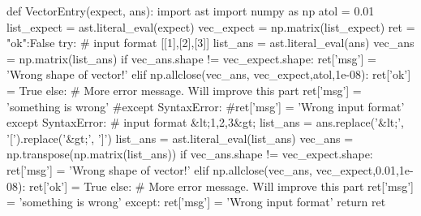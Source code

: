 
\begin{edXscript}
def VectorEntry(expect, ans):
	import ast
	import numpy as np 
  	atol = 0.01
	list_expect = ast.literal_eval(expect)
	vec_expect = np.matrix(list_expect)
  	ret = {"ok":False}
	try:
  		# input format [[1],[2],[3]]
		list_ans = ast.literal_eval(ans)
		vec_ans = np.matrix(list_ans)
  		if vec_ans.shape != vec_expect.shape:
  			ret['msg'] = 'Wrong shape of vector!'
  		elif np.allclose(vec_ans, vec_expect,atol,1e-08):
  			ret['ok'] = True
  		else:
  		# More error message. Will improve this part
  			ret['msg'] = 'something is wrong'   			
	#except SyntaxError:
		#ret['msg'] = 'Wrong input format'
	except SyntaxError:
  		# input format &lt;1,2,3&gt;
		list_ans = ans.replace('&lt;', '[').replace('&gt;', ']')
		list_ans = ast.literal_eval(list_ans)
		vec_ans = np.transpose(np.matrix(list_ans))
  		if vec_ans.shape != vec_expect.shape:
  			ret['msg'] = 'Wrong shape of vector!'
  		elif np.allclose(vec_ans, vec_expect,0.01,1e-08):
  			ret['ok'] = True
  		else:
    		# More error message. Will improve this part
  			ret['msg'] = 'something is wrong' 
  	except:
  		ret['msg'] = 'Wrong input format'
  	return ret 
\end{edXscript}
